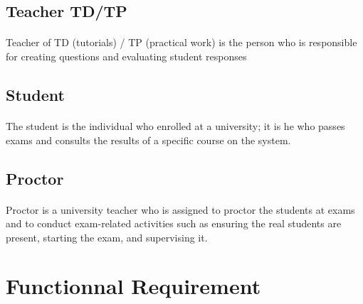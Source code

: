 \documentclass[]{uc2pfecaneva}
\begin{document}
    \raggedright\subsection{Teacher TD/TP}
    \paragraph{}
    Teacher of TD (tutorials) / TP (practical work) is the person who is responsible for creating questions and evaluating student responses


    \raggedright\subsection{Student}
    \paragraph{}
    The student is the individual who enrolled at a university; it is he who passes exams and consults the results of a specific course on the system.

    \raggedright\subsection{Proctor}
    \paragraph{}
    Proctor is a university teacher who is assigned to proctor the students at exams and to conduct exam-related activities such as ensuring the real students are present, starting the exam, and supervising it.

    \raggedright\section{Functionnal Requirement}
\end{document}
